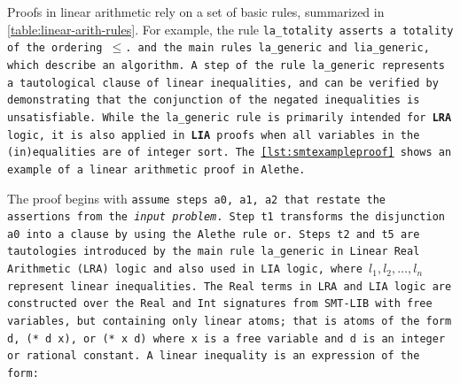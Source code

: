 Proofs in linear arithmetic rely on a set of basic rules, summarized in \cref{table:linear-arith-rules}.
For example, the rule \tt{la\_totality} asserts a totality of the ordering $\leq$.
and the main rules \tt{la\_generic} and \tt{lia\_generic}, which describe an algorithm.
A step of the rule \tt{la\_generic} represents a tautological clause of linear inequalities, and can be verified by demonstrating that the conjunction of the negated inequalities is unsatisfiable.
While the \tt{la\_generic rule} is primarily intended for \textbf{LRA} logic, it is also applied in \textbf{LIA} proofs when all variables in the (in)equalities are of integer sort.
The \cref{lst:smtexampleproof} shows an example of a linear arithmetic proof in Alethe.





The proof begins with \tt{assume} steps \tt{a0}, \tt{a1}, \tt{a2} that restate the assertions from the \emph{input problem}. %
Step \tt{t1} transforms the disjunction \texttt{a0} into a clause by using the Alethe rule \tt{or}.
Steps \tt{t2} and \tt{t5} are tautologies introduced by the main rule \tt{la\_generic}
in Linear Real Arithmetic (LRA) logic and also used in LIA logic, where \colorbox{Emerald!30}{$l_1, l_2,\dots, l_n$} represent linear inequalities.
The \lstinline[language=SMT,basicstyle=\ttfamily\footnotesize]{Real} terms in LRA and LIA logic are constructed over the \lstinline[language=SMT,basicstyle=\ttfamily\footnotesize]{Real} and \lstinline[language=SMT,basicstyle=\ttfamily\footnotesize]{Int} signatures from SMT-LIB with free variables, but containing only linear atoms; that is
atoms of the form \lstinline[language=SMT,basicstyle=\ttfamily\footnotesize]{d}, \lstinline[language=SMT,basicstyle=\ttfamily\footnotesize]{(* d x)}, or \lstinline[language=SMT,basicstyle=\ttfamily\footnotesize]{(* x d)}  where \lstinline[language=SMT,basicstyle=\ttfamily\footnotesize]{x} is a free variable and  \lstinline[language=SMT,basicstyle=\ttfamily\footnotesize]{d} is an integer or rational constant.
A linear inequality is an expression of the form:

